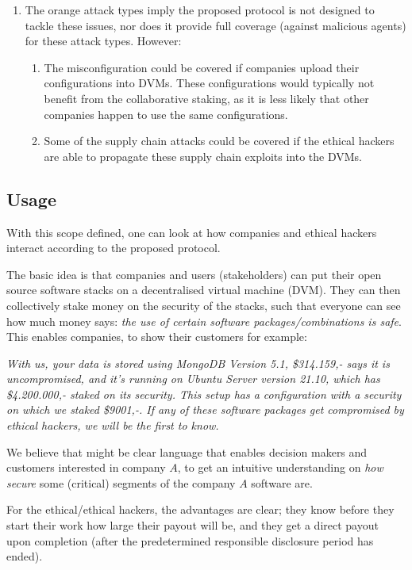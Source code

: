 \begin{enumerate} 
    \item The orange attack types imply the proposed protocol is not designed to tackle these issues, nor does it provide full coverage (against malicious agents) for these attack types. However:
    \begin{enumerate}
        \item The misconfiguration could be covered if companies upload their configurations into DVMs. These configurations would typically not benefit from the collaborative staking, as it is less likely that other companies happen to use the same configurations.
        \item Some of the supply chain attacks could be covered if the ethical hackers are able to propagate these supply chain exploits into the DVMs.
    \end{enumerate}
\end{enumerate}

\subsection{Usage}
\noindent With this scope defined, one can look at how companies and ethical hackers interact according to the proposed protocol.

The basic idea is that companies and users (stakeholders) can put their open source software stacks on a decentralised virtual machine (DVM). They can then collectively stake money on the security of the stacks, such that everyone can see how much money says: \textit{the use of certain software packages/combinations is safe}. This enables companies, to show their customers for example:

\textit{With us, your data is stored using MongoDB Version 5.1, \$314.159,- says it is uncompromised, and it's running on Ubuntu Server version 21.10, which has \$4.200.000,- staked on its security. This setup has a configuration with a security on which we staked \$9001,-. If any of these software packages get compromised by ethical hackers, we will be the first to know.}

We believe that might be clear language that enables decision makers and customers interested in company $A$, to get an intuitive understanding on \textit{how secure} some (critical) segments of the company $A$ software are.

For the ethical/ethical hackers, the advantages are clear; they know before they start their work how large their payout will be, and they get a direct payout upon completion (after the predetermined responsible disclosure period has ended).

